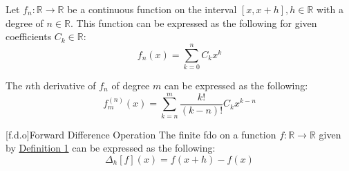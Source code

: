 \begin{definition}
  \label{def:general-function-definition}
  Let $f_n:\mathbb{R}\to\mathbb{R}$ be a continuous function on the interval $\left[x, x+h\right], h\in\mathbb{R}$ with a degree of $n\in\mathbb{R}$. This function can be expressed as the following for given coefficients $C_k\in\mathbb{R}$:
  \begin{equation}
    \label{eq:general-function-definition}
    f_n\left(x\right)=\sum_{k=0}^{n}C_kx^k
  \end{equation}
\end{definition}
\begin{definition}
  \label{def:nth-derivative-definition}
  The $n$th derivative of \hyperref[def:general-function-definition]{$f_n$} of degree $m$ can be expressed as the following:
  \begin{equation}
    \label{eq:nth-derivative-definition}
    f^{\left(n\right)}_m\left(x\right)=\sum_{k=n}^{m}\frac{k!}{\left(k-n\right)!}C_kx^{k-n}
  \end{equation}
\end{definition}
\begin{definition}
  \label{def:forward-difference-definition}
  [f.d.o]{Forward Difference Operation}
  The finite \ac{fdo} on a function $f:\mathbb{R}\to\mathbb{R}$ given by \hyperref[eq:forward-difference-definition]{Definition 1} can be expressed as the following:
  \begin{equation}
    \label{eq:forward-difference-definition}
    \Delta_{h}\left[f\right]\left(x\right)=f\left(x+h\right)-f\left(x\right)
  \end{equation}
\end{definition}